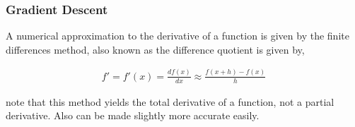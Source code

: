 \documentclass[jcp,aip,amsmath]{revtex4-1}
\begin{document}
\subsubsection{Gradient Descent}
A numerical approximation to the derivative of a function is given by the finite differences method,
also known as the difference quotient is given by,

\begin{align}
f' = f'(x) = \frac{df(x)}{dx} \approx \frac{f(x+h) -f(x)}{h}
\end{align}

note that this method yields the total derivative of a function, not a partial derivative.
Also can be made slightly more accurate easily.
\end{document}
